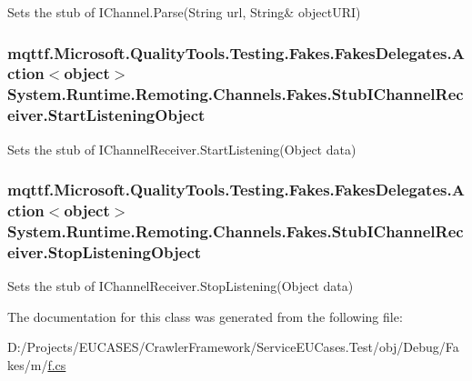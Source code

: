 Sets the stub of I\-Channel.\-Parse(String url, String\& object\-U\-R\-I)

\hypertarget{class_system_1_1_runtime_1_1_remoting_1_1_channels_1_1_fakes_1_1_stub_i_channel_receiver_a5f136fbc5ecf0d63b21405406e9db7fb}{
\subsubsection[{Start\-Listening\-Object}]{\setlength{\rightskip}{0pt plus 5cm}mqttf.\-Microsoft.\-Quality\-Tools.\-Testing.\-Fakes.\-Fakes\-Delegates.\-Action$<$object$>$ System.\-Runtime.\-Remoting.\-Channels.\-Fakes.\-Stub\-I\-Channel\-Receiver.\-Start\-Listening\-Object}}\label{class_system_1_1_runtime_1_1_remoting_1_1_channels_1_1_fakes_1_1_stub_i_channel_receiver_a5f136fbc5ecf0d63b21405406e9db7fb}


Sets the stub of I\-Channel\-Receiver.\-Start\-Listening(\-Object data)

\hypertarget{class_system_1_1_runtime_1_1_remoting_1_1_channels_1_1_fakes_1_1_stub_i_channel_receiver_a1b67ec5d6a87ae9d5f55bf71c7c5b4f9}{
\subsubsection[{Stop\-Listening\-Object}]{\setlength{\rightskip}{0pt plus 5cm}mqttf.\-Microsoft.\-Quality\-Tools.\-Testing.\-Fakes.\-Fakes\-Delegates.\-Action$<$object$>$ System.\-Runtime.\-Remoting.\-Channels.\-Fakes.\-Stub\-I\-Channel\-Receiver.\-Stop\-Listening\-Object}}\label{class_system_1_1_runtime_1_1_remoting_1_1_channels_1_1_fakes_1_1_stub_i_channel_receiver_a1b67ec5d6a87ae9d5f55bf71c7c5b4f9}


Sets the stub of I\-Channel\-Receiver.\-Stop\-Listening(\-Object data)



The documentation for this class was generated from the following file\-:\begin{DoxyCompactItemize}
\item 
D\-:/\-Projects/\-E\-U\-C\-A\-S\-E\-S/\-Crawler\-Framework/\-Service\-E\-U\-Cases.\-Test/obj/\-Debug/\-Fakes/m/\hyperlink{m_2f_8cs}{f.\-cs}\end{DoxyCompactItemize}
